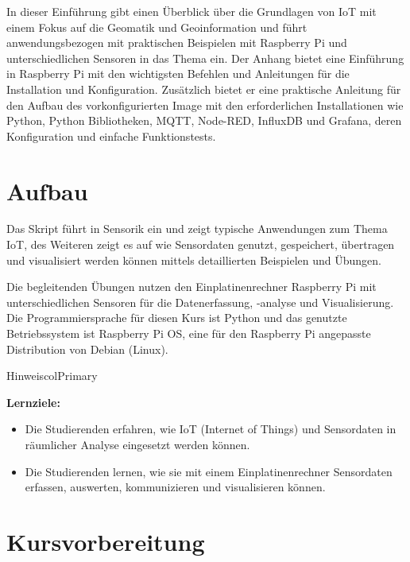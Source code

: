 \documentclass[
  11pt,
  a4paperpaper,
  oneside, openany  ,captions=tableheading
]{scrbook}
\providecommand{\tightlist}{%
  \setlength{\itemsep}{0pt}\setlength{\parskip}{0pt}}
\theoremstyle{definition}
\theoremstyle{remark}
\renewcommand{\markright}[1]{\def\chaptertitle{#1}} %
\begin{document}
In dieser Einführung gibt einen Überblick über die Grundlagen von IoT
mit einem Fokus auf die Geomatik und Geoinformation und führt
anwendungsbezogen mit praktischen Beispielen mit Raspberry Pi und
unterschiedlichen Sensoren in das Thema ein. Der Anhang bietet eine
Einführung in Raspberry Pi mit den wichtigsten Befehlen und Anleitungen
für die Installation und Konfiguration. Zusätzlich bietet er eine
praktische Anleitung für den Aufbau des vorkonfigurierten Image mit den
erforderlichen Installationen wie Python, Python Bibliotheken, MQTT,
Node-RED, InfluxDB und Grafana, deren Konfiguration und einfache
Funktionstests.

\section*{Aufbau}\label{aufbau}

\markright{Aufbau}

Das Skript führt in Sensorik ein und zeigt typische Anwendungen zum
Thema IoT, des Weiteren zeigt es auf wie Sensordaten genutzt,
gespeichert, übertragen und visualisiert werden können mittels
detaillierten Beispielen und Übungen.

Die begleitenden Übungen nutzen den Einplatinenrechner Raspberry Pi mit
unterschiedlichen Sensoren für die Datenerfassung, -analyse und
Visualisierung. Die Programmiersprache für diesen Kurs ist Python und
das genutzte Betriebssystem ist Raspberry Pi OS, eine für den Raspberry
Pi angepasste Distribution von Debian (Linux).

\begin{boxtitle}{Hinweis}{colPrimary}

\textbf{Lernziele:}

\begin{itemize}
\tightlist
\item
  Die Studierenden erfahren, wie IoT (Internet of Things) und
  Sensordaten in räumlicher Analyse eingesetzt werden können.
\item
  Die Studierenden lernen, wie sie mit einem Einplatinenrechner
  Sensordaten erfassen, auswerten, kommunizieren und visualisieren
  können.
\end{itemize}

\end{boxtitle}

\section*{Kursvorbereitung}\label{kursvorbereitung}
\end{document}
